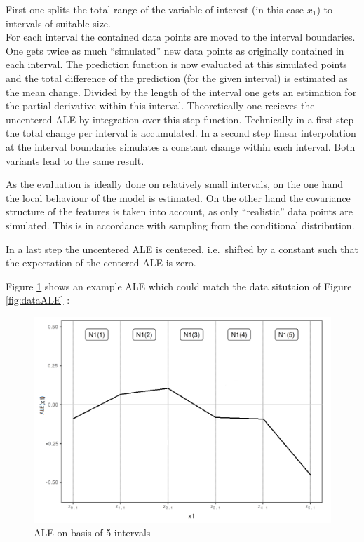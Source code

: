 \documentclass[
]{krantz}
\begin{document}
First one splits the total range of the variable of interest (in this case \(x_1\)) to intervals of suitable size.\\
For each interval the contained data points are moved to the interval boundaries. One gets twice as much ``simulated'' new data points as originally contained in each interval. The prediction function is now evaluated at this simulated points and the total difference of the prediction (for the given interval) is estimated as the mean change. Divided by the length of the interval one gets an estimation for the partial derivative within this interval. Theoretically one recieves the uncentered ALE by integration over this step function. Technically in a first step the total change per interval is accumulated. In a second step linear interpolation at the interval boundaries simulates a constant change within each interval. Both variants lead to the same result.

As the evaluation is ideally done on relatively small intervals, on the one hand the local behaviour of the model is estimated. On the other hand the covariance structure of the features is taken into account, as only ``realistic'' data points are simulated. This is in accordance with sampling from the conditional distribution.

In a last step the uncentered ALE is centered, i.e.~shifted by a constant such that the expectation of the centered ALE is zero.

Figure \ref{fig:aleEx} shows an example ALE which could match the data situtaion of Figure \ref{fig:dataALE} :

\begin{figure}
\includegraphics[width=1\linewidth]{images/ale_example} \caption{ALE on basis of 5 intervals}\label{fig:aleEx}
\end{figure}
\end{document}

